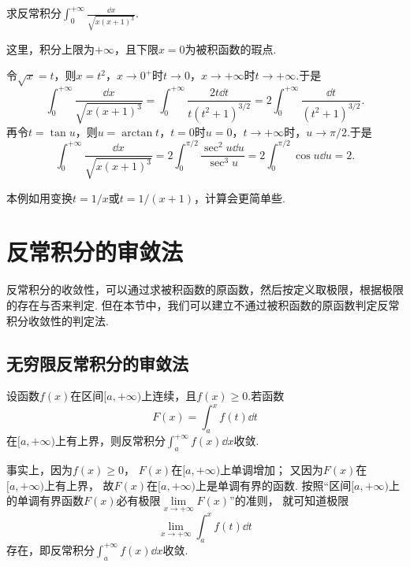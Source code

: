 \begin{example}
求反常积分\(\int_0^{+\infty} \frac{\dd{x}}{\sqrt{x(x+1)^3}}\).
\begin{solution}
这里，积分上限为\(+\infty\)，且下限\(x=0\)为被积函数的瑕点.

令\(\sqrt{x} = t\)，则\(x = t^2\)，\(x\to0^+\)时\(t\to0\)，\(x\to+\infty\)时\(t\to+\infty\).于是\[
\int_0^{+\infty} \frac{\dd{x}}{\sqrt{x(x+1)^3}}
= \int_0^{+\infty} \frac{2t\dd{t}}{t(t^2+1)^{3/2}}
= 2 \int_0^{+\infty} \frac{\dd{t}}{(t^2+1)^{3/2}}.
\]
再令\(t = \tan u\)，则\(u = \arctan t\)，\(t=0\)时\(u=0\)，\(t\to+\infty\)时，\(u\to\pi/2\).于是\[
\int_0^{+\infty} \frac{\dd{x}}{\sqrt{x(x+1)^3}}
= 2 \int_0^{\pi/2} \frac{\sec^2 u \dd{u}}{\sec^3 u}
= 2 \int_0^{\pi/2} \cos u \dd{u}
= 2.
\]
\end{solution}
本例如用变换\(t = 1/x\)或\(t = 1/(x+1)\)，计算会更简单些.
\end{example}

\section{反常积分的审敛法}
反常积分的收敛性，可以通过求被积函数的原函数，然后按定义取极限，根据极限的存在与否来判定.
但在本节中，我们可以建立不通过被积函数的原函数判定反常积分收敛性的判定法.

\subsection{无穷限反常积分的审敛法}
\begin{theorem}\label{theorem:定积分.无穷限反常积分的审敛法引理}
设函数\(f(x)\)在区间\([a,+\infty)\)上连续，且\(f(x) \geq 0\).若函数\[
F(x)=\int_a^x f(t) \dd{t}
\]在\([a,+\infty)\)上有上界，则反常积分\(\int_a^{+\infty} f(x) \dd{x}\)收敛.
\end{theorem}
事实上，因为\(f(x)\geq0\)，
\(F(x)\)在\([a,+\infty)\)上单调增加；
又因为\(F(x)\)在\([a,+\infty)\)上有上界，
故\(F(x)\)在\([a,+\infty)\)上是单调有界的函数.
按照“区间\([a,+\infty)\)上的单调有界函数\(F(x)\)必有极限\(\lim\limits_{x\to+\infty} F(x)\)”的准则，
就可知道极限\[
	\lim\limits_{x\to+\infty} \int_a^x f(t) \dd{t}
\]存在，即反常积分\(\int_a^{+\infty} f(x) \dd{x}\)收敛.

